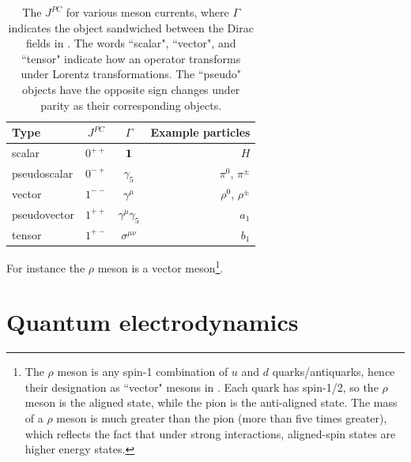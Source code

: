 \begin{table}
\begin{tabularx}{\linewidth}{LCCr} \hline\hline
Type         & $J^{PC}$ & $\Gamma$ & Example particles \\\hline
scalar       & $0^{++}$ & ${\mathbf 1}$                 &  $H$\\
pseudoscalar & $0^{-+}$ & $\gamma_5$            &  $\pi^0$, $\pi^{\pm}$\\ 
vector       & $1^{--}$ & $\gamma^\mu$          &  $\rho^0$, $\rho^{\pm}$\\ 
pseudovector & $1^{++}$ & $\gamma^\mu\gamma_5$  &  $a_1$\\ 
tensor       & $1^{+-}$ & $\sigma^{\mu\nu}$     &  $b_1$\\ 
\hline\hline
\end{tabularx}
\caption{The $J^{PC}$ for various meson currents, where $\Gamma$ indicates the
object sandwiched between the Dirac fields in .
The words ``scalar", ``vector", and ``tensor" indicate how an operator
transforms under Lorentz transformations. The ``pseudo" objects have the
opposite sign changes under parity as their corresponding objects.}
\label{tab:discreteSymm}
\end{table}

For instance the $\rho$ meson is a vector meson\footnote{The $\rho$ meson is any 
spin-1 combination of $u$ and $d$
quarks/antiquarks, hence their designation as ``vector" mesons in
. Each quark has spin-1/2, so the $\rho$ meson is the
aligned state, while the pion is the anti-aligned state. The mass of a
$\rho$ meson is much greater than the pion (more than five times greater), which
reflects the fact that under strong interactions, aligned-spin states are higher
energy states.}.

\section{Quantum electrodynamics}\label{sec:qed}


